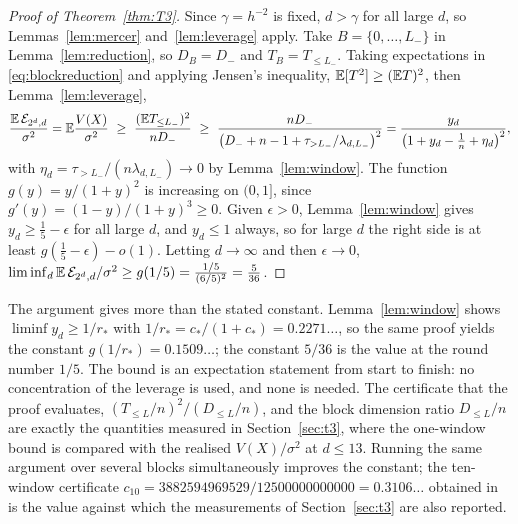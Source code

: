 \begin{proof}[Proof of Theorem~\ref{thm:T3}]
Since $\gamma=h^{-2}$ is fixed, $d>\gamma$ for all large $d$, so Lemmas~\ref{lem:mercer}
and~\ref{lem:leverage} apply. Take $B=\{0,\dots,L_-\}$ in Lemma~\ref{lem:reduction}, so $D_B=D_-$ and
$T_B=T_{\le L_-}$. Taking
expectations in \eqref{eq:blockreduction} and applying Jensen's inequality, $\mathbb{E}[T^2]\ge(\mathbb{E} T)^2$, then
Lemma~\ref{lem:leverage},
\[
\frac{\mathbb{E}\,\mathcal E_{2^d,d}}{\sigma^2}=\mathbb{E}\frac{V(X)}{\sigma^2}\ \ge\ \frac{(\mathbb{E} T_{\le L_-})^2}{nD_-}
\ \ge\ \frac{nD_-}{\big(D_-+n-1+\tau_{>L_-}/\lambda_{d,L_-}\big)^2}
=\frac{y_d}{\big(1+y_d-\tfrac1n+\eta_d\big)^2},
\]
with $\eta_d=\tau_{>L_-}/(n\lambda_{d,L_-})\to0$ by Lemma~\ref{lem:window}. The function
$g(y)=y/(1+y)^2$ is increasing on $(0,1]$, since $g'(y)=(1-y)/(1+y)^3\ge0$. Given $\epsilon>0$,
Lemma~\ref{lem:window} gives $y_d\ge\frac15-\epsilon$ for all large $d$, and $y_d\le1$ always, so for large
$d$ the right side is at least $g(\tfrac15-\epsilon)-o(1)$. Letting $d\to\infty$ and then $\epsilon\to0$,
$\liminf_d\mathbb{E}\,\mathcal E_{2^d,d}/\sigma^2\ge g(1/5)=\frac{1/5}{(6/5)^2}=\frac5{36}$.
\end{proof}

\begin{remark}\label{rem:sharper}
The argument gives more than the stated constant. Lemma~\ref{lem:window} shows $\liminf y_d\ge1/r_*$
with $1/r_*=c_*/(1+c_*)=0.2271\ldots$, so the same proof yields the constant $g(1/r_*)=0.1509\ldots$;
the constant $5/36$ is the value at the round number $1/5$. The bound is an expectation statement from
start to finish: no concentration of the leverage is used, and none is needed. The certificate that the
proof evaluates, $(T_{\le L}/n)^2/(D_{\le L}/n)$, and the block dimension ratio $D_{\le L}/n$ are exactly the
quantities measured in Section~\ref{sec:t3}, where the one-window bound is compared with the realised
$V(X)/\sigma^2$ at $d\le13$. Running the same argument over several blocks simultaneously improves the
constant; the ten-window certificate $c_{10}=3882594969529/12500000000000=0.3106\ldots$ obtained in
\cite{PN24} is the value against which the measurements of Section~\ref{sec:t3} are also reported.
\end{remark}
